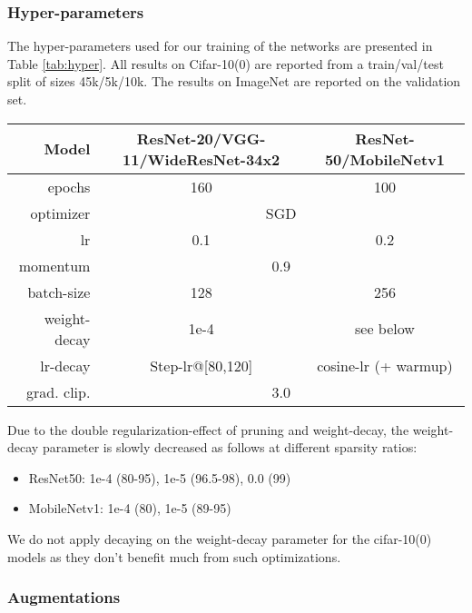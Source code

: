 \documentclass[10pt,twocolumn,letterpaper]{article}
\begin{document}
\subsubsection{Hyper-parameters}
The hyper-parameters used for our training of the networks are presented in Table \ref{tab:hyper}. All results on Cifar-10(0) are reported from a train/val/test split of sizes 45k/5k/10k. The results on ImageNet are reported on the validation set.


\begin{table*}
\centering
\begin{tabular}{||r | c  |  c ||} 
 \hline
 Model & ResNet-20/VGG-11/WideResNet-34x2 & ResNet-50/MobileNetv1 \\ \hline\hline
 epochs & 160 & 100\\\hline
 optimizer & \multicolumn{2}{c||}{SGD}\\\hline
 lr & 0.1 & 0.2\\\hline
 momentum & \multicolumn{2}{c||}{0.9}\\\hline
 batch-size & 128 & 256\\\hline
 weight-decay & 1e-4 & see below\\\hline
 lr-decay & Step-lr@[80,120] & cosine-lr (+ warmup)\\\hline
 grad. clip. & \multicolumn{2}{c||}{3.0}\\
 
 \hline

\end{tabular}


\caption{
Hyper-parameters used for training. (left: networks on Cifar-10, right: networks on ImageNet)}\label{tab:hyper}

\end{table*}

Due to the double regularization-effect of pruning and weight-decay, the weight-decay parameter is slowly decreased as follows at different sparsity ratios:
\begin{itemize}
\item ResNet50: 1e-4 (80-95), 1e-5 (96.5-98), 0.0 (99)
\item MobileNetv1: 1e-4 (80), 1e-5 (89-95)
\end{itemize}
We do not apply decaying on the weight-decay parameter for the cifar-10(0) models as they don't benefit much from such optimizations. 

\subsubsection{Augmentations}
\end{document}
